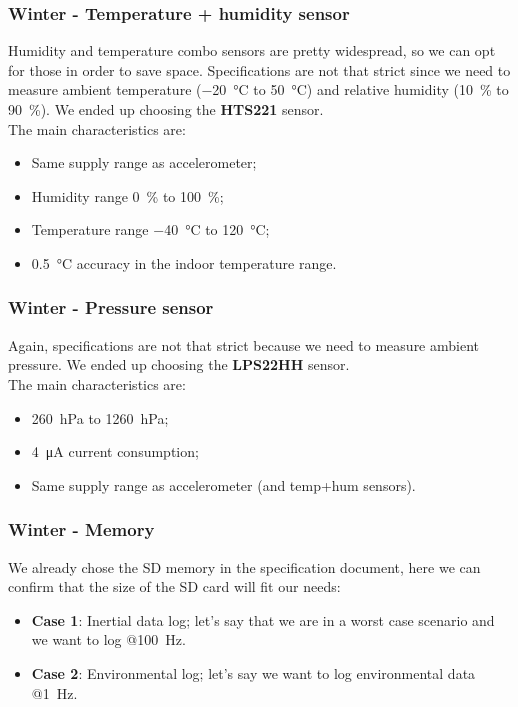\documentclass[11pt,xcolor=table,aspectratio=169]{beamer}
\begin{document}
	\begin{frame}
		\frametitle{Winter - Temperature + humidity sensor}
		Humidity and temperature combo sensors are pretty widespread, so we can opt for those in order to save space. Specifications are not that strict since we need to measure ambient temperature (\SI{-20}{\degreeCelsius} to \SI{50}{\degreeCelsius}) and relative humidity (\SI{10}{\percent} to \SI{90}{\percent}). We ended up choosing the \textbf{HTS221} sensor.\\
		The main characteristics are:
		\begin{itemize}
			\item Same supply range as accelerometer;
			\item Humidity range \SI{0}{\percent} to \SI{100}{\percent};
			\item Temperature range \SI{-40}{\degreeCelsius} to \SI{120}{\degreeCelsius};
			\item \SI{0.5}{\degreeCelsius} accuracy in the indoor temperature range.
		\end{itemize}
	\end{frame}

	\begin{frame}
		\frametitle{Winter - Pressure sensor}
		Again, specifications are not that strict because we need to measure ambient pressure. We ended up choosing the \textbf{LPS22HH} sensor.\\
		The main characteristics are:
		\begin{itemize}
			\item \SI{260}{\hecto\pascal} to \SI{1260}{\hecto\pascal};
			\item \SI{4}{\micro\ampere} current consumption;
			\item Same supply range as accelerometer (and temp+hum sensors).
		\end{itemize}
	\end{frame}

	\begin{frame}
		\frametitle{Winter - Memory}
		We already chose the SD memory in the specification document, here we can confirm that the size of the SD card will fit our needs:
		\begin{itemize}
			\item \textbf{Case 1}: Inertial data log; let's say that we are in a worst case scenario and we want to log @\SI{100}{\hertz}.
			\item \textbf{Case 2}: Environmental log; let's say we want to log environmental data @\SI{1}{\hertz}.
		\end{itemize}
	\end{frame}
\end{document}
